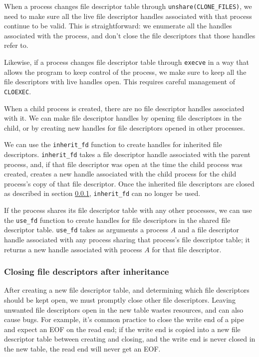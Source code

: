 \documentclass[letterpaper,twocolumn,10pt]{article}
\begin{document}
When a process changes file descriptor table through \verb|unshare(CLONE_FILES)|,
we need to make sure all the live file descriptor handles associated with that process continue to be valid.
This is straightforward:
we enumerate all the handles associated with the process,
and don't close the file descriptors that those handles refer to.

Likewise, if a process changes file descriptor table through \texttt{execve}
in a way that allows the program to keep control of the process,
we make sure to keep all the file descriptors with live handles open.
This requires careful management of \texttt{CLOEXEC}.

When a child process is created,
there are no file descriptor handles associated with it.
We can make file descriptor handles by opening file descriptors in the child,
or by creating new handles for file descriptors opened in other processes.

We can use the \verb|inherit_fd| function to create handles for inherited file descriptors.
\verb|inherit_fd| takes a file descriptor handle associated with the parent process,
and, if that file descriptor was open at the time the child process was created,
creates a new handle associated with the child process
for the child process's copy of that file descriptor.
Once the inherited file descriptors are closed as described in section \ref{cloexec},
\verb|inherit_fd| can no longer be used.

If the process shares its file descriptor table with any other processes,
we can use the \verb|use_fd| function to create handles for file descriptors
in the shared file descriptor table.
\verb|use_fd| takes as arguments a process $A$
and a file descriptor handle associated with any process sharing that process's file descriptor table;
it returns a new handle associated with process $A$ for that file descriptor.
\subsubsection{Closing file descriptors after inheritance}\label{cloexec}
After creating a new file descriptor table,
and determining which file descriptors should be kept open,
we must promptly close other file descriptors.
Leaving unwanted file descriptors open in the new table wastes resources,
and can also cause bugs.
For example, it's common practice to close the write end of a pipe
and expect an EOF on the read end;
if the write end is copied into a new file descriptor table between creating and closing,
and the write end is never closed in the new table,
the read end will never get an EOF.
\end{document}
